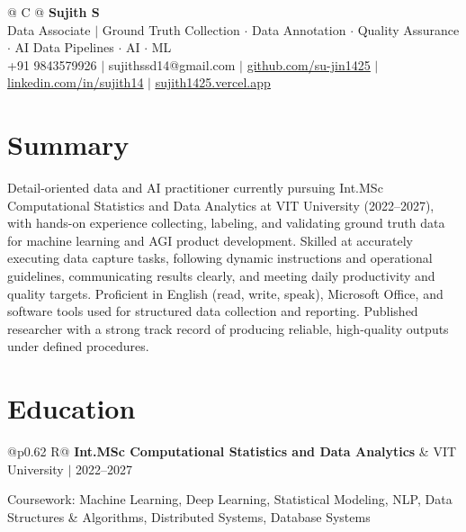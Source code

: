 \documentclass[a4paper,10pt]{article}
\newcommand{\ulink}[2]{\href{#1}{\uline{#2}}}
\newcommand{\subheading}[1]{{\color[HTML]{0A0A0A}\fontsize{12}{14}\selectfont\bfseries #1}}
\newcommand{\meta}[1]{{\color[HTML]{5C5C5C}\fontsize{10.5}{12.5}\selectfont #1}}
\begin{document}
\pagestyle{empty}

\begin{tabularx}{\linewidth}{@{} C @{}}
{\color[HTML]{000000}\fontsize{30}{35}\selectfont\bfseries Sujith S} \\[5pt]
{\fontsize{10.5}{12.5}\selectfont\color[HTML]{3A3A3A}
Data Associate $|$ Ground Truth Collection $\cdot$ Data Annotation $\cdot$ Quality Assurance $\cdot$ AI Data Pipelines $\cdot$ AI $\cdot$ ML } \\[6pt]
{\fontsize{10.5}{12.5}\selectfont\textcolor[HTML]{3A3A3A}{
+91 9843579926 $|$
sujithssd14@gmail.com $|$
\ulink{https://github.com/su-jin1425}{github.com/su-jin1425} $|$
\ulink{https://linkedin.com/in/sujith14}{linkedin.com/in/sujith14} $|$
\ulink{https://sujith1425.vercel.app}{sujith1425.vercel.app}}}
\end{tabularx}

\vspace{2pt}

\section{Summary}
\vspace{5pt}
{\color[HTML]{0A0A0A}\fontsize{11}{14}\selectfont
Detail-oriented data and AI practitioner currently pursuing Int.MSc Computational Statistics and Data Analytics at VIT University (2022--2027), with hands-on experience collecting, labeling, and validating ground truth data for machine learning and AGI product development. Skilled at accurately executing data capture tasks, following dynamic instructions and operational guidelines, communicating results clearly, and meeting daily productivity and quality targets. Proficient in English (read, write, speak), Microsoft Office, and software tools used for structured data collection and reporting. Published researcher with a strong track record of producing reliable, high-quality outputs under defined procedures.}

\vspace{2pt}

\section{Education}
\vspace{2pt}

\begin{tabularx}{\linewidth}{@{}p{0.62\linewidth} R@{}}
\subheading{Int.MSc Computational Statistics and Data Analytics} & \meta{VIT University $|$ 2022--2027}
\end{tabularx}
\vspace{1pt}
{\color[HTML]{3A3A3A}\fontsize{11}{14}\selectfont Coursework: Machine Learning, Deep Learning, Statistical Modeling, NLP, Data Structures \& Algorithms, Distributed Systems, Database Systems}
\end{document}
